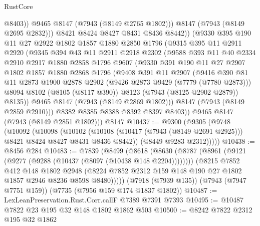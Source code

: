 \begin{lexlean}{RustCore}
\begin{coremodule}
                @8403))
            @9465
            @8147
            (@7943 (@8149 @2765 @1802)))
          @8147
          (@7943 (@8149 @2695 @2832)))
        @8421
        @8424
        @8427
        @8431
        @8436
        @8442))
    (@9330
      @395
      @190
      @11
      @27
      @2922
      @1802
      @1857
      @1880
      @2850
      @1796
      (@9315
        @395
        @11
        @2911
        @2920
        (@9345
          @394
          @43
          @11
          @2911
          @2918
          @2302
          (@9588
            @393
            @11
            @40
            @2334
            @2910
            @2917
            @1880
            @2858
            @1796
            @9607
            (@9330
              @391
              @190
              @11
              @27
              @2907
              @1802
              @1857
              @1880
              @2868
              @1796
              (@9408
                @391
                @11
                @2907
                (@9416
                  @390
                  @81
                  @11
                  @2873
                  @1900
                  @2878
                  @2902
                  (@9426 @2873 @9429 (@7779 (@7780 @2873)))
                  @8094
                  @8102
                  (@8105 (@8117 @390))
                  @8123
                  (@7943 (@8125 @2902 @2879))
                  @8135))
              @9465
              @8147
              (@7943 (@8149 @2869 @1802)))
            @8147
            (@7943 (@8149 @2859 @2910)))
          @8382
          @8385
          @8388
          @8392
          @8397
          @8403))
      @9465
      @8147
      (@7943 (@8149 @2851 @1802)))
    @8147
@10437 := @9300
    (@9305
      (@9748
        (@10092
          (@10098
            (@10102
              (@10108 (@10417 (@7943 (@8149 @2691 @2925))) @8421 @8424 @8427 @8431 @8436 @8442))
            (@8449 @9283 @2312)))))
@10438 := @8456 @284
@10483 := @7839
    (@8499
      (@8618
        (@8630
          (@8787 (@8961 (@9121 (@9277 (@9288 (@10437 (@8097 (@10438 @148 @2204))))))))
          (@8215
            @7852
            @412
            @148
            @1802
            @2948
            (@8224 @7852 @2312 @159 @148 @190 @27 @1802 @1857 @2946 @8236 @8598 @8480)))))
    (@7918 (@7939 @135))
    (@7943 (@7947 @7751 @159))
    (@7735 (@7956 @159 @174 @1837 @1802))
@10487 := LexLeanPreservation.Rust.Corr.callF @7389 @7391 @7393
@10495 := @10487 @7822 @23 @195 @32 @148 @1802 @1862 @503
@10500 := @8242 @7822 @2312 @195 @32 @1862

\end{coremodule}
\end{lexlean}
